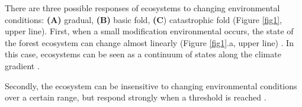 




There are three possible responses of ecosystems to changing environmental
conditions: \textbf{(A)} gradual, \textbf{(B)} basic fold, \textbf{(C})
catastrophic fold  \cite{Scheffer2001} (Figure \ref{fig1}, upper line). First,
when a small modification environmental occurs, the state of the forest
ecosystem can change almost linearly (Figure \ref{fig1}.a, upper line)
\cite{Scheffer2001,Scheffer2009}. In this case, ecosystems can be seen as a
continuum of states along the climate gradient
\cite{Scheffer2001,Scheffer2009,scheffer2009critical}.


Secondly, the ecosystem can be insensitive to
changing environmental conditions over a certain range, but respond
strongly when a threshold is reached \cite{scheffer2009critical}. 


